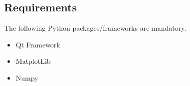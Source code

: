 \documentclass{article}
\begin{document}
\subsection{Requirements}
The following Python packages/frameworks are mandatory.

\begin{itemize}
  \item Qt Framework
  \item MatplotLib
  \item Numpy
\end{itemize}





\end{document}

